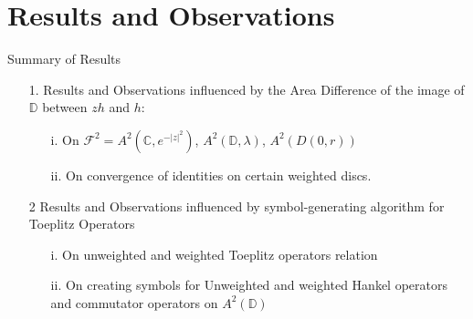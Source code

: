 \documentclass{reu_beamer}
\begin{document}
\section{Results and Observations}
\begin{frame}{Summary of Results}
\begin{enumerate}
 \item[1.] Results and Observations influenced by the Area Difference of the image of $\mathbb{D}$ between $zh$ and $h$: 
   \begin{itemize}
    \item[i.] On $\mathcal{F}^2=A^2(\mathbb{C},e^{-|z|^2})$, $A^2(\mathbb{D},\lambda)$, $A^2(D(0,r))$
    \item[ii.] On convergence of identities on certain weighted discs.
  \end{itemize}
\item[2] Results and Observations influenced by symbol-generating algorithm for Toeplitz Operators
\begin{itemize}
\item[i.] On unweighted and weighted Toeplitz operators relation
\item[ii.] On creating symbols for Unweighted and weighted Hankel operators and commutator operators on $A^2(\mathbb{D})$ %
\end{itemize}
\end{enumerate}
\end{frame}
\end{document}
